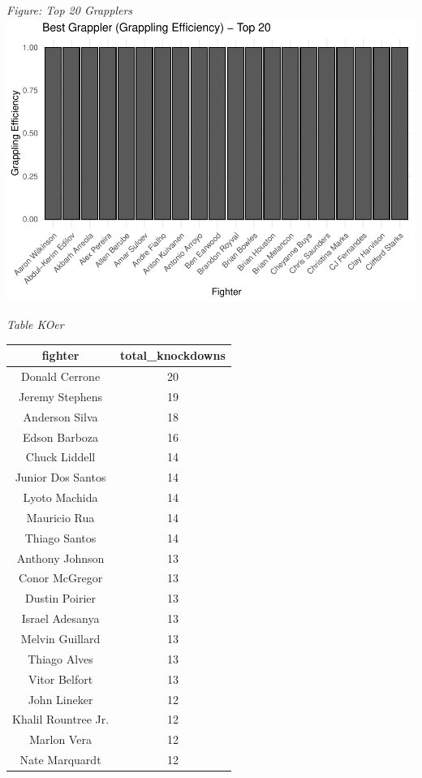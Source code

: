 \documentclass[
  man,floatsintext]{apa6}
\begin{document}
\emph{Figure: Top 20 Grapplers}
\includegraphics{Into-the-UFC--outline-_files/figure-latex/unnamed-chunk-6-1.pdf}

\emph{Table KOer}

\begin{tabular}{c|c}
\hline
fighter & total\_knockdowns\\
\hline
Donald Cerrone & 20\\
\hline
Jeremy Stephens & 19\\
\hline
Anderson Silva & 18\\
\hline
Edson Barboza & 16\\
\hline
Chuck Liddell & 14\\
\hline
Junior Dos Santos & 14\\
\hline
Lyoto Machida & 14\\
\hline
Mauricio Rua & 14\\
\hline
Thiago Santos & 14\\
\hline
Anthony Johnson & 13\\
\hline
Conor McGregor & 13\\
\hline
Dustin Poirier & 13\\
\hline
Israel Adesanya & 13\\
\hline
Melvin Guillard & 13\\
\hline
Thiago Alves & 13\\
\hline
Vitor Belfort & 13\\
\hline
John Lineker & 12\\
\hline
Khalil Rountree Jr. & 12\\
\hline
Marlon Vera & 12\\
\hline
Nate Marquardt & 12\\
\hline
\end{tabular}
\end{document}

